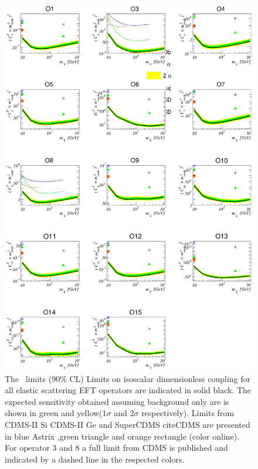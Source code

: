 \begin{figure}
\begin{minipage}{1.\linewidth}{}
\centerline{\includegraphics[width=\textwidth,height=\textheight,keepaspectratio]{Figures/SizeTestCDMS.eps}}
\end{minipage}
\caption{The \Xehund\ limits (90\% CL) Limits on isoscalar dimensionless coupling for all elastic scattering EFT operators are indicated in solid black. The expected sensitivity obtained assuming background only are is shown in green and yellow(1$\sigma$ and 2$\sigma$ respectively). Limits from CDMS-II Si CDMS-II Ge and SuperCDMS cite{CDMS} are presented in blue Astrix ,green triangle and orange rectangle (color online). For operator 3 and 8 a full limit from CDMS is published and indicated by a dashed line in the respected colors.}
\label{fig:elasticLimit}
\end{figure}


